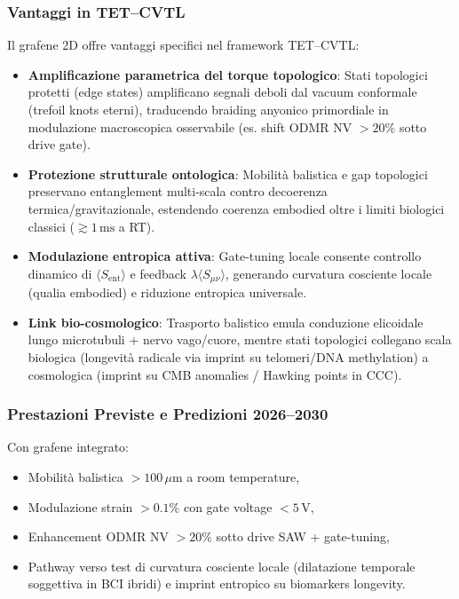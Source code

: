 \documentclass[12pt,a4paper]{article}
\begin{document}
\subsubsection{Vantaggi in TET–CVTL}

Il grafene 2D offre vantaggi specifici nel framework TET–CVTL:
\begin{itemize}
    \item \textbf{Amplificazione parametrica del torque topologico}: Stati topologici protetti (edge states) amplificano segnali deboli dal vacuum conformale (trefoil knots eterni), traducendo braiding anyonico primordiale in modulazione macroscopica osservabile (es. shift ODMR NV $>20\%$ sotto drive gate).
    
    \item \textbf{Protezione strutturale ontologica}: Mobilità balistica e gap topologici preservano entanglement multi-scala contro decoerenza termica/gravitazionale, estendendo coerenza embodied oltre i limiti biologici classici ($\gtrsim 1\,\mathrm{ms}$ a RT).
    
    \item \textbf{Modulazione entropica attiva}: Gate-tuning locale consente controllo dinamico di $\langle S_{\mathrm{ent}} \rangle$ e feedback $\lambda \langle S_{\mu\nu} \rangle$, generando curvatura cosciente locale (qualia embodied) e riduzione entropica universale.
    
    \item \textbf{Link bio-cosmologico}: Trasporto balistico emula conduzione elicoidale lungo microtubuli + nervo vago/cuore, mentre stati topologici collegano scala biologica (longevità radicale via imprint su telomeri/DNA methylation) a cosmologica (imprint su CMB anomalies / Hawking points in CCC).
\end{itemize}

\subsubsection{Prestazioni Previste e Predizioni 2026--2030}

Con grafene integrato:
\begin{itemize}
    \item Mobilità balistica $>100\,\mu$m a room temperature,
    \item Modulazione strain $>0.1\%$ con gate voltage $<5\,\mathrm{V}$,
    \item Enhancement ODMR NV $>20\%$ sotto drive SAW + gate-tuning,
    \item Pathway verso test di curvatura cosciente locale (dilatazione temporale soggettiva in BCI ibridi) e imprint entropico su biomarkers longevity.
\end{itemize}
\end{document}
